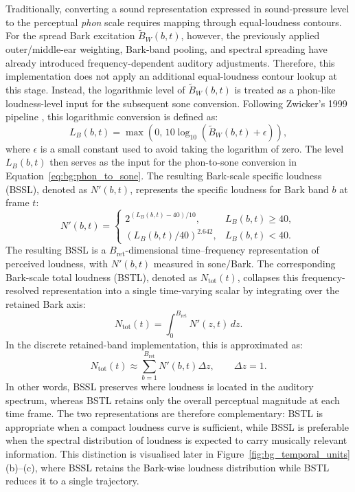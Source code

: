 Traditionally, converting a sound representation expressed in sound-pressure level to the perceptual \emph{phon} scale requires mapping through equal-loudness contours. For the spread Bark excitation $\widetilde{B}_W(b,t)$, however, the previously applied outer/middle-ear weighting, Bark-band pooling, and spectral spreading have already introduced frequency-dependent auditory adjustments. Therefore, this implementation does not apply an additional equal-loudness contour lookup at this stage. Instead, the logarithmic level of $\widetilde{B}_W(b,t)$ is treated as a phon-like loudness-level input for the subsequent sone conversion. Following Zwicker's 1999 pipeline \cite{zwicker1999psychoacoustics,pampalk2002content,pampalk2004exploring}, this logarithmic conversion is defined as:
\begin{equation}
L_B(b,t)=\max\!\left(0,\,10\log_{10}\!\left(\widetilde{B}_W(b,t)+\epsilon\right)\right),
\label{eq:bg:spread_bark_level}
\end{equation}
where $\epsilon$ is a small constant used to avoid taking the logarithm of zero. The level $L_B(b,t)$ then serves as the input for the phon-to-sone conversion in Equation~\eqref{eq:bg:phon_to_sone}. The resulting Bark-scale specific loudness (BSSL), denoted as $N'(b,t)$, represents the specific loudness for Bark band $b$ at frame $t$:
\begin{equation}
N'(b,t)=
\begin{cases}
2^{(L_B(b,t)-40)/10}, & L_B(b,t)\ge40,\\[4pt]
(L_B(b,t)/40)^{2.642}, & L_B(b,t)<40.
\end{cases}
\label{eq:bg:bssl}
\end{equation}
The resulting BSSL is a $B_{\mathrm{ret}}$-dimensional time--frequency representation of perceived loudness, with $N'(b,t)$ measured in sone/Bark. The corresponding Bark-scale total loudness (BSTL), denoted as $N_{\mathrm{tot}}(t)$, collapses this frequency-resolved representation into a single time-varying scalar by integrating over the retained Bark axis:
\begin{equation}
N_{\mathrm{tot}}(t)=\int_{0}^{B_{\mathrm{ret}}} N'(z,t)\,dz.
\label{eq:bg:total_loudness_cont}
\end{equation}
In the discrete retained-band implementation, this is approximated as:
\begin{equation}
N_{\mathrm{tot}}(t)\approx \sum_{b=1}^{B_{\mathrm{ret}}} N'(b,t)\Delta z,
\qquad \Delta z = 1.
\label{eq:bg:total_loudness_discrete}
\end{equation}
In other words, BSSL preserves where loudness is located in the auditory spectrum, whereas BSTL retains only the overall perceptual magnitude at each time frame. The two representations are therefore complementary: BSTL is appropriate when a compact loudness curve is sufficient, while BSSL is preferable when the spectral distribution of loudness is expected to carry musically relevant information. This distinction is visualised later in Figure~\ref{fig:bg_temporal_units}(b)--(c), where BSSL retains the Bark-wise loudness distribution while BSTL reduces it to a single trajectory.

